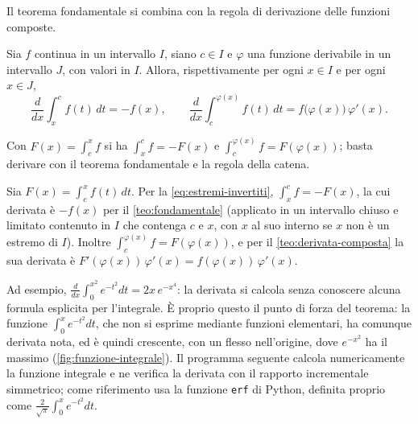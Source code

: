 Il teorema fondamentale si combina con la regola di derivazione delle funzioni composte.

\begin{corollario}\label{cor:estremi-variabili}
Sia $f$ continua in un intervallo $I$, siano $c\in I$ e $\varphi$ una funzione
derivabile in un intervallo $J$, con valori in $I$. Allora, rispettivamente per ogni
$x\in I$ e per ogni $x\in J$,
\begin{equation}\label{eq:estremi-variabili}
  \frac{d}{dx}\int_{x}^{c}f(t)\,dt=-f(x), \qquad
  \frac{d}{dx}\int_{c}^{\varphi(x)}f(t)\,dt=f\bigl(\varphi(x)\bigr)\,\varphi'(x) .
\end{equation}
\end{corollario}

\begin{schema}
\end{schema}

\begin{strategia}
Con $F(x)=\int_{c}^{x}f$ si ha $\int_{x}^{c}f=-F(x)$ e $\int_{c}^{\varphi(x)}f=F(\varphi(x))$;
basta derivare con il teorema fondamentale e la regola della catena.
\end{strategia}

\begin{dimostrazione}
Sia $F(x)=\int_{c}^{x}f(t)\,dt$. Per la \eqref{eq:estremi-invertiti},
$\int_{x}^{c}f=-F(x)$, la cui derivata è $-f(x)$ per il \cref{teo:fondamentale} (applicato
in un intervallo chiuso e limitato contenuto in $I$ che contenga $c$ e $x$, con $x$ al suo
interno se $x$ non è un estremo di $I$). Inoltre
$\int_{c}^{\varphi(x)}f=F(\varphi(x))$, e per il \cref{teo:derivata-composta} la sua derivata
è $F'(\varphi(x))\,\varphi'(x)=f(\varphi(x))\,\varphi'(x)$.
\end{dimostrazione}

Ad esempio, $\frac{d}{dx}\int_{0}^{x^{2}}e^{-t^{2}}dt=2x\,e^{-x^{4}}$: la derivata si calcola
senza conoscere alcuna formula esplicita per l'integrale. È proprio questo il punto di
forza del teorema: la funzione $\int_{0}^{x}e^{-t^{2}}dt$, che non si esprime mediante
funzioni elementari, ha comunque derivata nota, ed è quindi crescente, con un flesso
nell'origine, dove $e^{-x^{2}}$ ha il massimo (\cref{fig:funzione-integrale}). Il programma
seguente calcola numericamente la funzione integrale e ne verifica la derivata con il
rapporto incrementale simmetrico; come riferimento usa la funzione \texttt{erf} di Python,
definita proprio come $\frac2{\sqrt\pi}\int_{0}^{x}e^{-t^{2}}dt$.

